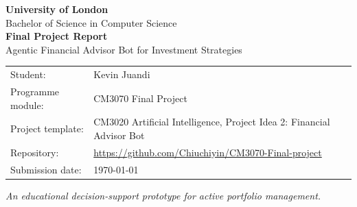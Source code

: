 \documentclass[a4paper,12pt]{book}
\begin{document}
\begin{titlepage}\thispagestyle{empty}\begin{center}
{\Large\textbf{University of London}}\\[.2cm]
{\large Bachelor of Science in Computer Science}\\[1.2cm]
{\Huge\textbf{Final Project Report}}\\[.6cm]
{\LARGE Agentic Financial Advisor Bot for Investment Strategies}\\[1.5cm]
\begin{tabular}{ll}Student: & Kevin Juandi\\Programme module: & CM3070 Final Project\\Project template: & CM3020 Artificial Intelligence, Project Idea 2: Financial Advisor Bot\\Repository: & \url{https://github.com/Chiuchiyin/CM3070-Final-project}\\Submission date: & \today\end{tabular}
\vfill\textit{An educational decision-support prototype for active portfolio management.}
\end{center}\end{titlepage}
\frontmatter\tableofcontents\listoffigures
\mainmatter
\backmatter
\end{document}
